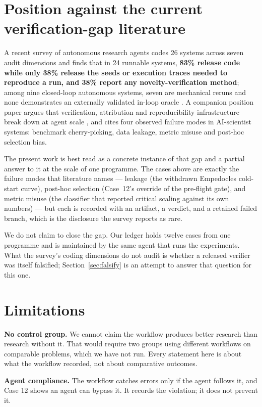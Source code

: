 \documentclass[11pt]{article}
\begin{document}
\section{Position against the current verification-gap literature}

A recent survey of autonomous research agents codes 26 systems across seven
audit dimensions and finds that in 24 runnable systems, \textbf{83\% release
code while only 38\% release the seeds or execution traces needed to reproduce
a run, and 38\% report any novelty-verification method}; among nine closed-loop
autonomous systems, seven are mechanical reruns and none demonstrates an
externally validated in-loop oracle \cite{ding2026verificationgap}. A companion
position paper argues that verification, attribution and reproducibility
infrastructure break down at agent scale \cite{mo2026paradigm}, and cites four
observed failure modes in AI-scientist systems: benchmark cherry-picking, data
leakage, metric misuse and post-hoc selection bias.

The present work is best read as a concrete instance of that gap and a partial
answer to it at the scale of one programme. The cases above are exactly the
failure modes that literature names --- leakage (the withdrawn Empedocles
cold-start curve), post-hoc selection (Case~12's override of the pre-flight
gate), and metric misuse (the classifier that reported critical scaling against
its own numbers) --- but each is recorded with an artifact, a verdict, and a
retained failed branch, which is the disclosure the survey reports as rare.

We do not claim to close the gap. Our ledger holds twelve cases from one
programme and is maintained by the same agent that runs the experiments. What
the survey's coding dimensions do not audit is whether a released verifier was
itself falsified; Section~\ref{sec:falsify} is an attempt to answer that
question for this one.

\section{Limitations}

\textbf{No control group.} We cannot claim the workflow produces better
research than research without it. That would require two groups using
different workflows on comparable problems, which we have not run. Every
statement here is about what the workflow recorded, not about comparative
outcomes.

\textbf{Agent compliance.} The workflow catches errors only if the agent
follows it, and Case 12 shows an agent can bypass it. It records the
violation; it does not prevent it.
\end{document}
